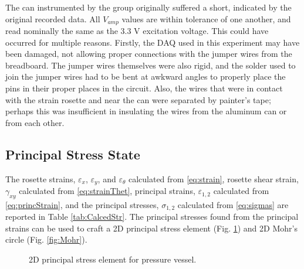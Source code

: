 \documentclass[10pt,journal,letterpaper]{IEEEtran}
\begin{document}
The can instrumented by the group originally suffered a short, indicated by the original recorded data.
All $V_{amp}$ values are within tolerance of one another, and read nominally the same as the 3.3 V excitation voltage.
This could have occurred for multiple reasons.
Firstly, the DAQ used in this experiment may have been damaged, not allowing proper connections with the jumper wires from the breadboard.
The jumper wires themselves were also rigid, and the solder used to join the jumper wires had to be bent at awkward angles to properly place the pins in their proper places in the circuit.
Also, the wires that were in contact with the strain rosette and near the can were separated by painter's tape; perhaps this was insufficient in insulating the wires from the aluminum can or from each other.

\subsection{Principal Stress State}

The rosette strains, $\varepsilon_x$, $\varepsilon_y$, and $\varepsilon_\theta$ calculated from \eqref{eq:strain}, rosette shear strain, $\gamma_{xy}$ calculated from \eqref{eq:strainThet}, principal strains, $\varepsilon_{1,2}$ calculated from \ref{eq:princStrain}, and the principal stresses, $\sigma_{1,2}$ calculated from \eqref{eq:sigmas} are reported in Table \ref{tab:CalcedStr}.
The principal stresses found from the principal strains can be used to craft a 2D principal stress element (Fig. \ref{fig:2dSquare}) and 2D Mohr's circle (Fig. \ref{fig:Mohr}). 

\begin{figure}[H]
\centering
{}
\caption{2D principal stress element for pressure vessel.}
\label{fig:2dSquare}
\end{figure}
\end{document}
